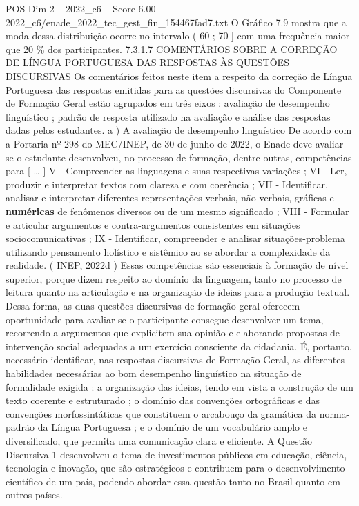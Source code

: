 \begin{textsample}{POS Dim 2 – 2022\_c6 – Score 6.00 – 2022\_c6/enade\_2022\_tec\_gest\_fin\_154467fad7.txt}
O Gráfico 7.9 mostra que a moda dessa distribuição ocorre no intervalo ( 60 ; 70 ] com uma frequência maior que 20 \% dos participantes. 7.3.1.7 COMENTÁRIOS SOBRE A CORREÇÃO DE LÍNGUA PORTUGUESA DAS RESPOSTAS ÀS QUESTÕES DISCURSIVAS Os comentários feitos neste item a respeito da correção de Língua Portuguesa das respostas emitidas para as questões discursivas do Componente de Formação Geral estão agrupados em três eixos : avaliação de desempenho linguístico ; padrão de resposta utilizado na avaliação e análise das respostas dadas pelos estudantes. a ) A avaliação de desempenho linguístico De acordo com a Portaria nº 298 do MEC/INEP, de 30 de junho de 2022, o Enade deve avaliar se o estudante desenvolveu, no processo de formação, dentre outras, competências para [ … ] V - Compreender as linguagens e suas respectivas variações ; VI - Ler, produzir e interpretar textos com clareza e com coerência ; VII - Identificar, analisar e interpretar diferentes representações verbais, não verbais, gráficas e \textbf{numéricas} de fenômenos diversos ou de um mesmo significado ; VIII - Formular e articular argumentos e contra-argumentos consistentes em situações sociocomunicativas ; IX - Identificar, compreender e analisar situações-problema utilizando pensamento holístico e sistêmico ao se abordar a complexidade da realidade. ( INEP, 2022d ) Essas competências são essenciais à formação de nível superior, porque dizem respeito ao domínio da linguagem, tanto no processo de leitura quanto na articulação e na organização de ideias para a produção textual.
Dessa forma, as duas questões discursivas de formação geral oferecem oportunidade para avaliar se o participante consegue desenvolver um tema, recorrendo a argumentos que explicitem sua opinião e elaborando propostas de intervenção social adequadas a um exercício consciente da cidadania.
É, portanto, necessário identificar, nas respostas discursivas de Formação Geral, as diferentes habilidades necessárias ao bom desempenho linguístico na situação de formalidade exigida : a organização das ideias, tendo em vista a construção de um texto coerente e estruturado ; o domínio das convenções ortográficas e das convenções morfossintáticas que constituem o arcabouço da gramática da norma-padrão da Língua Portuguesa ; e o domínio de um vocabulário amplo e diversificado, que permita uma comunicação clara e eficiente.
A Questão Discursiva 1 desenvolveu o tema de investimentos públicos em educação, ciência, tecnologia e inovação, que são estratégicos e contribuem para o desenvolvimento científico de um país, podendo abordar essa questão tanto no Brasil quanto em outros países.

\end{textsample}
